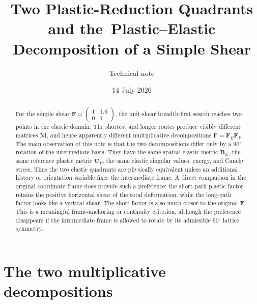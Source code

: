 \documentclass[11pt]{article}
\title{Two Plastic-Reduction Quadrants and the\
Plastic--Elastic Decomposition of a Simple Shear}
\author{Technical note}
\date{14 July 2026}
\begin{document}
\maketitle

\begin{abstract}
For the simple shear
\(
 \mathbf F=\left(\begin{smallmatrix}1&1.6\\0&1\end{smallmatrix}\right)
\), the unit-shear breadth-first search reaches two points in the elastic
domain.  The shortest and longer routes produce visibly different matrices
\(\mathbf M\), and hence apparently different multiplicative decompositions
\(\mathbf F=\mathbf F_E\mathbf F_P\).  The main observation of this note is
that the two decompositions differ only by a $90^\circ$ rotation of the
intermediate basis.  They have the same spatial elastic metric
\(\mathbf B_E\), the same reference plastic metric \(\mathbf C_P\), the same
elastic singular values, energy, and Cauchy stress.  Thus the two elastic
quadrants are physically equivalent unless an additional history or
orientation variable fixes the intermediate frame.  A direct comparison in
the original coordinate frame does provide such a preference: the short-path
plastic factor retains the positive horizontal shear of the total
deformation, while the long-path factor looks like a vertical shear.  The
short factor is also much closer to the original \(\mathbf F\).  This is a
meaningful frame-anchoring or continuity criterion, although the preference
disappears if the intermediate frame is allowed to rotate by its admissible
$90^\circ$ lattice symmetry.
\end{abstract}

\section{The two multiplicative decompositions}
\end{document}
